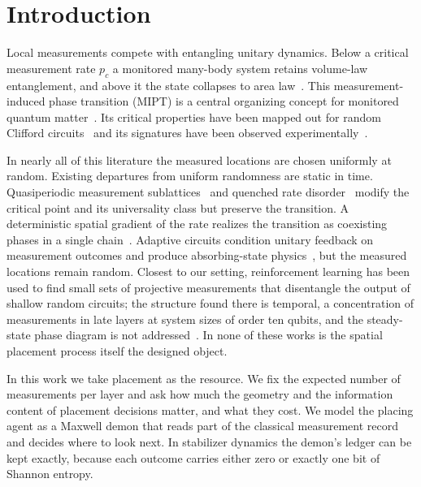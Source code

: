 \documentclass[aps,prb,twocolumn,superscriptaddress,nofootinbib]{revtex4-2}
\begin{document}
\section{Introduction}
\label{sec:intro}

Local measurements compete with entangling unitary dynamics. Below a
critical measurement rate $p_c$ a monitored many-body system retains
volume-law entanglement, and above it the state collapses to area
law~\cite{Li2018,Skinner2019,Chan2019}. This measurement-induced phase
transition (MIPT) is a central organizing concept for monitored quantum
matter~\cite{Fisher2023}. Its critical properties have been mapped out for
random Clifford circuits~\cite{Gullans2020,Zabalo2020} and its signatures
have been observed experimentally~\cite{Google2023,Feng2026}.

In nearly all of this literature the measured locations are chosen
uniformly at random. Existing departures from uniform randomness are
static in time. Quasiperiodic measurement sublattices~\cite{Shkolnik2023}
and quenched rate disorder~\cite{Zabalo2023} modify the critical point and
its universality class but preserve the transition. A deterministic
spatial gradient of the rate realizes the transition as coexisting phases
in a single chain~\cite{Li2026space}. Adaptive circuits condition unitary
feedback on measurement outcomes and produce absorbing-state
physics~\cite{Iadecola2023,Sierant2023,ODea2024,Buchhold2022,Piroli2023},
but the measured locations remain random. Closest to our setting,
reinforcement learning has been used to find small sets of projective
measurements that disentangle the output of shallow random circuits; the
structure found there is temporal, a concentration of measurements in late
layers at system sizes of order ten qubits, and the steady-state phase
diagram is not addressed~\cite{Bao2024}. In none of these works is the
spatial placement process itself the designed object.

In this work we take placement as the resource. We fix the expected number
of measurements per layer and ask how much the geometry and the
information content of placement decisions matter, and what they cost. We
model the placing agent as a Maxwell demon that reads part of the
classical measurement record and decides where to look next. In stabilizer
dynamics the demon's ledger can be kept exactly, because each outcome
carries either zero or exactly one bit of Shannon entropy.
\end{document}
